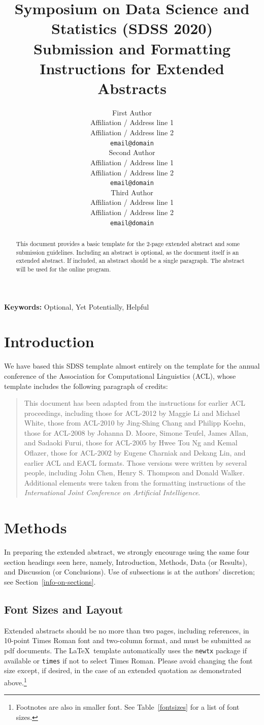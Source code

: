 \documentclass[10pt]{article}
\title{Symposium on Data Science and Statistics (SDSS 2020) \\
Submission and Formatting Instructions for Extended Abstracts}
\author{
  First Author \\
  Affiliation / Address line 1 \\
  Affiliation / Address line 2 \\
  {\tt email@domain} \\\And
  Second Author \\
  Affiliation / Address line 1 \\
  Affiliation / Address line 2 \\
  {\tt email@domain} \\\And
  Third Author \\
  Affiliation / Address line 1 \\
  Affiliation / Address line 2 \\
  {\tt email@domain} \\}
\date{}
\begin{document}
\maketitle
\begin{abstract}
This document provides a basic template for the 2-page extended abstract
and some submission guidelines.
Including an abstract is optional, as the document itself is an extended abstract.
If included, an abstract should be a single paragraph. The abstract will be used for the online program.
\end{abstract}

{\bf Keywords:} Optional, Yet Potentially, Helpful

\section{Introduction}

We have based this SDSS template almost entirely on the template for
the annual conference of the Association for Computational Linguistics (ACL), whose
template includes the following paragraph of credits:
\begin{quotation}
\small %
This document has been adapted from the instructions for earlier ACL
proceedings, including those for ACL-2012 by Maggie Li and Michael
White, those from ACL-2010 by Jing-Shing Chang and Philipp Koehn,
those for ACL-2008 by Johanna D. Moore, Simone Teufel, James Allan,
and Sadaoki Furui, those for ACL-2005 by Hwee Tou Ng and Kemal
Oflazer, those for ACL-2002 by Eugene Charniak and Dekang Lin, and
earlier ACL and EACL formats. Those versions were written by several
people, including John Chen, Henry S. Thompson and Donald
Walker. Additional elements were taken from the formatting
instructions of the {\em International Joint Conference on Artificial
  Intelligence}.
\end{quotation}  

\section{Methods}

In preparing the extended abstract, 
we strongly encourage using the same four section headings seen here, namely, 
Introduction, Methods, Data (or Results), and Discussion (or Conclusions).
Use of subsections is at the authors' discretion; see Section~\ref{info-on-sections}.

\subsection{Font Sizes and Layout}
Extended abstracts should be no more than two pages, including references,
in 10-point Times Roman font and two-column format, and must be submitted as pdf documents.
The \LaTeX\ template automatically uses the {\tt newtx} package if available
or {\tt times} if not to select Times Roman.
Please avoid changing the font size except, if desired, in the case of an extended
quotation as demonstrated above.\footnote{Footnotes are also in smaller font.  
See Table~\ref{fontsizes} for a list of font sizes.}
\end{document}
